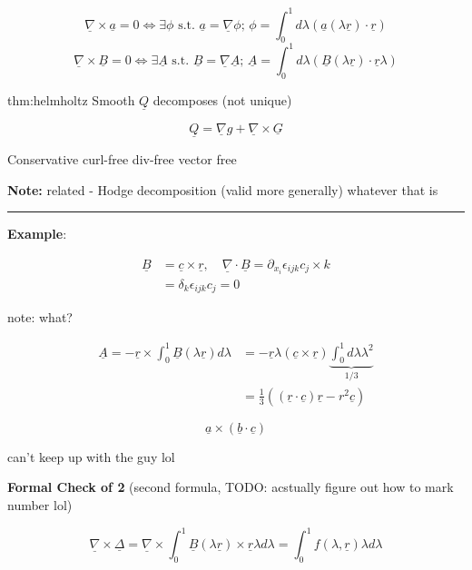 \documentclass{article}
\begin{document}
\[\underline{\nabla} \times \underline{a} = 0 \iff \exists\phi \text{ s.t. } \underline{a} = \underline{\nabla} \phi ;\, \phi = \int_{0}^{1} d\lambda (\underline{a} ( \lambda \underline{r}) \cdot \underline{r})\]
\[\underline{\nabla} \times \underline{B} = 0 \iff \exists \underline{A} \text{ s.t. } \underline{B} = \underline{\nabla} \underline{A} ;\, \underline{A} = \int_{0}^{1} d\lambda (\underline{B} ( \lambda \underline{r}) \cdot \underline{r}\lambda)\]

\begin{thm}{thm:helmholtz}{}
    Smooth $\underline{Q}$ decomposes (not unique)

    \[\underline{Q} = \underline{\nabla} g + \underline{\nabla} \times \underline{G}\]

    Conservative curl-free div-free vector free
\end{thm}

\textbf{Note:} related - Hodge decomposition (valid more generally) whatever that is

\noindent\rule{\textwidth}{0.2pt}

\textbf{Example}: 


\begin{align*}
    \underline{B} &= \underline{c} \times \underline{r},\quad \underline{\nabla} \cdot \underline{B} = \partial_{x_{i}} \epsilon_{ijk} c_{j} \times k\\
                  &= \delta_{k}\epsilon_{ijk}c_{j} = 0
\end{align*}

note: what?

\begin{align*}
    \underline{A} = -\underline{r} \times \int_{0}^{1} \underline{B}(\lambda \underline{r}) d\lambda &= -\underline{r} \lambda (\underline{c} \times \underline{r}) \underbrace{\int_{0}^{1} d\lambda \lambda^{2}}_{1 /3}\\
    &= \frac{1}{3} ((\underline{r} \cdot \underline{c})\underline{r} - r^{2}\underline{c})
\end{align*}

\[\underline{a} \times (\underline{b} \cdot \underline{ c})\]

can't keep up with the guy lol

\newpage

\textbf{Formal Check of 2} (second formula, TODO: acstually figure out how to mark number lol)


\[\underline{\nabla} \times \underline{\Delta} = \underline{\nabla} \times \int_{0}^{1} \underline{B} (\lambda \underline{r}) \times \underline{r} \lambda d\lambda = \int_{0}^{1} f(\lambda, \underline{r}) \lambda d\lambda\]
\end{document}
